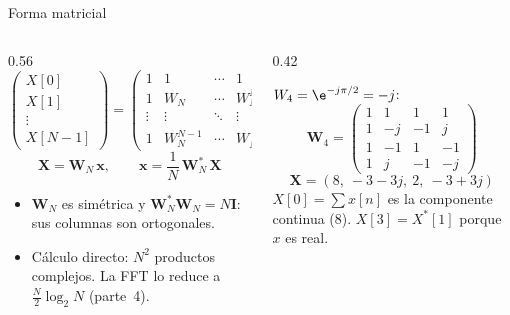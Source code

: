 \documentclass[aspectratio=169,11pt]{beamer}
\begin{document}
\begin{frame}{Forma matricial}
  \begin{columns}[c]
    \begin{column}{0.56\textwidth}
      \small
      \[
        \begin{pmatrix}X[0]\\X[1]\\\vdots\\X[N-1]\end{pmatrix}=
        \begin{pmatrix}
          1&1&\cdots&1\\
          1&W_N&\cdots&W_N^{N-1}\\
          \vdots&\vdots&\ddots&\vdots\\
          1&W_N^{N-1}&\cdots&W_N^{(N-1)(N-1)}
        \end{pmatrix}
        \begin{pmatrix}x[0]\\x[1]\\\vdots\\x[N-1]\end{pmatrix}
      \]
      \[
        \mathbf X=\mathbf W_N\,\mathbf x,\qquad \mathbf x=\frac1N\,\mathbf W_N^{*}\,\mathbf X
      \]
      \begin{itemize}\small
        \item $\mathbf W_N$ es simétrica y $\mathbf W_N^{*}\mathbf W_N=N\mathbf I$: sus columnas son ortogonales.
        \item Cálculo directo: $N^2$ productos complejos. La FFT lo reduce a $\frac N2\log_2N$ (parte~4).
      \end{itemize}
    \end{column}
    \begin{column}{0.42\textwidth}
      \begin{ejemplo}[$N=4$, $x=(1,3,4,0)$]
        \footnotesize
        $W_4=\e^{-j\pi/2}=-j$:
        \[
          \mathbf W_4=\begin{pmatrix}1&1&1&1\\1&-j&-1&j\\1&-1&1&-1\\1&j&-1&-j\end{pmatrix}
        \]
        \[
          \mathbf X=(8,\ -3-3j,\ 2,\ -3+3j)
        \]
        $X[0]=\sum x[n]$ es la componente continua (8). $X[3]=X^*[1]$ porque $x$ es real.
      \end{ejemplo}
    \end{column}
  \end{columns}
\end{frame}
\end{document}
